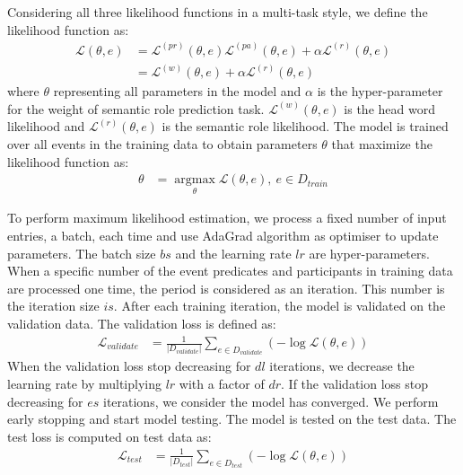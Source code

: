 \documentclass[a4paper]{article}
\begin{document}
Considering all three likelihood functions in a multi-task style, we define the likelihood function as:
\begin{equation} \label{eq:likelihood}
\begin{aligned}
    \mathcal{L}(\theta, e)
        &= \mathcal{L}^{(pr)}(\theta, e) \mathcal{L}^{(pa)}(\theta, e) + \alpha \mathcal{L}^{(r)}(\theta, e)    \\
        &= \mathcal{L}^{(w)}(\theta, e) + \alpha \mathcal{L}^{(r)}(\theta, e)
\end{aligned}
\end{equation}
where $\theta$ representing all parameters in the model and $\alpha$ is the hyper-parameter for the weight of semantic role prediction task. $\mathcal{L}^{(w)}(\theta, e)$ is the head word likelihood and $\mathcal{L}^{(r)}(\theta, e)$ is the semantic role likelihood. 
The model is trained over all events in the training data to obtain parameters $\theta$ that maximize the likelihood function as:
\begin{equation} \label{eq:mle}
\begin{aligned}
    \theta
        &= \mathop{argmax} \limits_{\theta} \mathcal{L}(\theta, e),\ e \in D_{train}
\end{aligned}
\end{equation}

To perform maximum likelihood estimation, we process a fixed number of input entries, a batch, each time and use AdaGrad algorithm \citep{duchi2011adaptive} as optimiser to update parameters. The batch size $bs$ and the learning rate $lr$ are hyper-parameters. When a specific number of the event predicates and participants in training data are processed one time, the period is considered as an iteration. This number is the iteration size $is$. After each training iteration, the model is validated on the validation data. The validation loss is defined as: 
\begin{equation} \label{eq:validation}
\begin{aligned}
    \mathcal{L}_{validate}
        &= \frac{1}{|D_{validate}|} \sum_{e \in D_{validate}} (-\log \mathcal{L}(\theta, e))
\end{aligned}
\end{equation}
When the validation loss stop decreasing for $dl$ iterations, we decrease the learning rate by multiplying $lr$ with a factor of $dr$. If the validation loss stop decreasing for $es$ iterations, we consider the model has converged. We perform early stopping and start model testing. The model is tested on the test data. The test loss is computed on test data as:
\begin{equation} \label{eq:test-likelihood}
\begin{aligned}
    \mathcal{L}_{test}
        &= \frac{1}{|D_{test}|} \sum_{e \in D_{test}} (-\log \mathcal{L}(\theta, e))
\end{aligned}
\end{equation}
\end{document}
